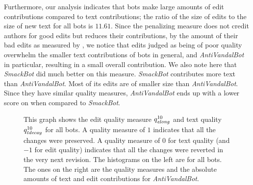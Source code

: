 Furthermore, our analysis indicates that bots make large amounts of
edit contributions compared to text contributions; the ratio
of the size of edits \editonly to the size of new text \textonly
for all bots is $11.61$.
Since the penalizing measure \punish does not credit authors for
good edits but reduces their \textlong contributions, by the
amount of their bad edits as measured by \editlong, we notice that
edits judged as being of poor quality overwhelm the smaller text
contributions of bots in general, and \textit{AntiVandalBot} in particular,
resulting in a small overall contribution.
We also note here that \textit{SmackBot} did much better on this
measure.
\textit{SmackBot} contributes more text than \textit{AntiVandalBot}.
Most of its edits are of smaller size than \textit{AntiVandalBot}.
Since they have similar quality measures, \textit{AntiVandalBot} ends
up with a lower score on \punish when compared to \textit{SmackBot}.

%
\begin{figure}[tbhp]
    \begin{center}
    \end{center}
    \caption[Measuring edit and text quality for bots]{
    	This graph shows the edit quality measure $\quality{elong}{10}{}$
        and text quality $\quality{tdecay}{10}{}$ for all bots.
        A quality measure of $1$ indicates that all the changes
        were preserved.
        A quality measure of $0$ for text quality (and $-1$ for edit quality)
	indicates that all the changes
        were reverted in the very next revision.
        The histograms on the left are for all bots.
        The ones on the right are the quality measures and the absolute amounts
        of text and edit contributions for \textit{AntiVandalBot}.
    }
    \label{bot-contribs}
\end{figure}
